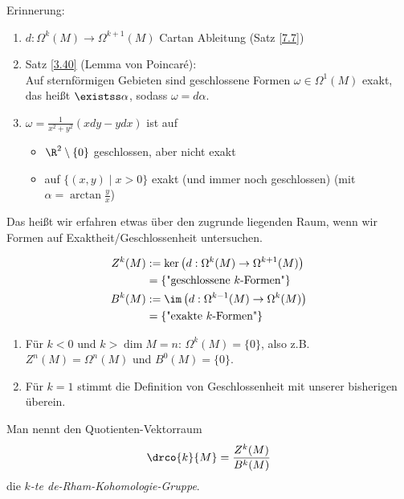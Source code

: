 \lecture

Erinnerung: \begin{enumerate}[label={\roman*})]
	\item $ d: \Omega^k(M) \to \Omega^{k+1}(M) $ Cartan Ableitung (Satz \ref{7.7})
	\item Satz \ref{3.40} (Lemma von Poincaré):\\
		Auf sternförmigen Gebieten sind geschlossene Formen $\omega \in \Omega^1(M)$ exakt, das heißt $\existss \alpha$, sodass $\omega = d\alpha$.
	\item \label{erinnerung} $ \omega = \frac{1}{x^2+y^2}(xdy - ydx) $ ist auf
		\begin{itemize}
			\item $\R^2 \setminus \{0\}$ geschlossen, aber nicht exakt
			\item auf $\{(x,y) \mid x>0\}$ exakt (und immer noch geschlossen) (mit $\alpha = \arctan \frac{y}{x}$)
		\end{itemize}
\end{enumerate}

Das heißt wir erfahren etwas über den zugrunde liegenden Raum, wenn wir Formen auf Exaktheit/Geschlossenheit untersuchen.

\begin{defn}
	\begin{align*}
		Z^k(M) &:= \ker \left( d: \Omega^k(M) \to \Omega^{k+1}(M) \right)\\
			&= \{ \text{"geschlossene $k$-Formen"} \}\\
		B^k(M) &:= \im \left( d: \Omega^{k-1}(M) \to \Omega^k(M) \right)\\
			&= \{ \text{"exakte $k$-Formen"} \}
	\end{align*}
\end{defn}

\begin{rem*}
	\begin{enumerate}[label={\roman*})]
		\item Für $k<0$ und $k>\dim M = n$: $ \Omega^k(M) = \{0\} $, also z.B. $ Z^n(M) = \Omega^n(M) $ und $ B^0(M) = \{0\}. $
		\item Für $k=1$ stimmt die Definition von Geschlossenheit mit unserer bisherigen überein.
	\end{enumerate}
\end{rem*}

\begin{defn}
	Man nennt den Quotienten-Vektorraum
	\[ \drco{k}{M} = \frac{Z^k(M)}{B^k(M)} \]
	die \emph{$k$-te de-Rham-Kohomologie-Gruppe}.
\end{defn}

